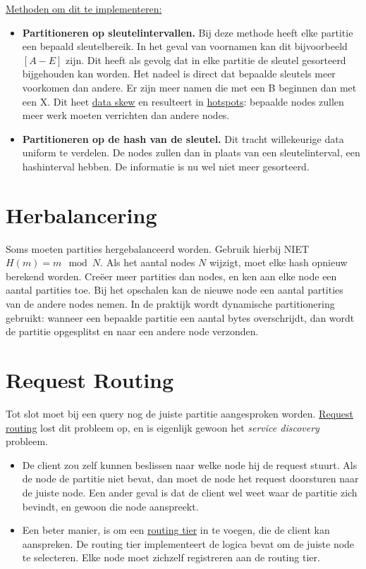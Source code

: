 	\underline{Methoden om dit te implementeren:}
	\begin{itemize}
		\item[\info] \textbf{Partitioneren op sleutelintervallen.} Bij deze methode heeft elke partitie een bepaald sleutelbereik. In het geval van voornamen kan dit bijvoorbeeld $[A-E]$ zijn. Dit heeft als gevolg dat in elke partitie de sleutel gesorteerd bijgehouden kan worden. Het nadeel is direct dat bepaalde sleutels meer voorkomen dan andere. Er zijn meer namen die met een B beginnen dan met een X. Dit heet \underline{data skew} en resulteert in \underline{hotspots}: bepaalde nodes zullen meer werk moeten verrichten dan andere nodes. 
		\item[\info] \textbf{Partitioneren op de hash van de sleutel.} Dit tracht willekeurige data uniform te verdelen. De nodes zullen dan in plaats van een sleutelinterval, een hashinterval hebben. De informatie is nu wel niet meer gesorteerd. 


	\end{itemize}

	\section{Herbalancering}

	Soms moeten partities hergebalanceerd worden. Gebruik hierbij NIET $H(m) = m \mod N$. Als het aantal nodes $N$ wijzigt, moet elke hash opnieuw berekend worden. Creëer meer partities dan nodes, en ken aan elke node een aantal partities toe. Bij het opschalen kan de nieuwe node een aantal partities van de andere nodes nemen. In de praktijk wordt dynamische partitionering gebruikt: wanneer een bepaalde partitie een aantal bytes overschrijdt, dan wordt de partitie opgesplitst en naar een andere node verzonden. 

	\section{Request Routing}
	Tot slot moet bij een query nog de juiste partitie aangesproken worden. \underline{Request routing} lost dit probleem op, en is eigenlijk gewoon het \emph{service discovery} probleem. \begin{itemize}
		\item[\info] De client zou zelf kunnen beslissen naar welke node hij de request stuurt. Als de node de partitie niet bevat, dan moet de node het request doorsturen naar de juiste node. Een ander geval is dat de client wel weet waar de partitie zich bevindt, en gewoon die node aanspreekt.
		\item[\info] Een beter manier, is om een \underline{routing tier} in te voegen, die de client kan aanspreken. De routing tier implementeert de logica bevat om de juiste node te selecteren. Elke node moet zichzelf registreren aan de routing tier.
	\end{itemize}

